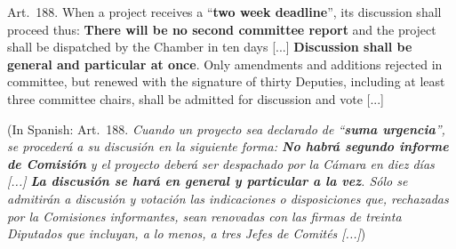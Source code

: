 \documentclass[letter,12pt]{article}
\begin{document}

\singlespacing

Art.~188. When a project receives a ``\textbf{two week deadline}'', its discussion shall proceed thus: \textbf{There will be no second committee report} and the project shall be dispatched by the Chamber in ten days [...]
\textbf{Discussion shall be general and particular at once}. Only amendments and additions rejected in committee, but renewed with the signature of thirty Deputies, including at least three committee chairs, shall be admitted for discussion and vote [...]

(In Spanish: Art.~188. \emph{Cuando un proyecto sea declarado de ``\textbf{suma urgencia}'', se procederá a su discusión en la siguiente forma: \textbf{No habrá segundo informe de Comisión} y el proyecto deberá ser despachado por la Cámara en diez días [...]
\textbf{La discusión se hará en general y particular a la vez}. Sólo se admitirán a discusión y votación las indicaciones o disposiciones que, rechazadas por la Comisiones informantes, sean renovadas con las firmas de treinta Diputados que incluyan, a lo menos, a tres Jefes de Comités [...]})
\end{document}
